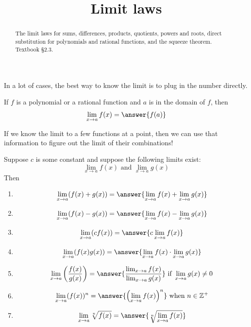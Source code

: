 \documentclass{ximera}
\title{Limit laws}
\begin{document}
\begin{abstract}
The limit laws for sums, differences, products, quotients, powers and roots, direct substitution for polynomials and rational functions, and the squeeze theorem. Textbook §2.3.
\end{abstract}
\maketitle

In a lot of cases, the best way to know the limit is to plug in the number directly.

\begin{theorem}
\label{theorem:3-5}
If $f$ is a polynomial or a rational function and $a$ is in the domain of $f$, then
\[
\lim _{x \rightarrow a} f(x)=\answer{f(a)}
\]
\end{theorem}

If we know the limit to a few functions at a point, then we can use that information to figure out the limit of their combinations!

\begin{theorem}
\label{theorem:3-6}
Suppose $c$ is some constant and suppose the following limits exist:
\[
\lim _{x \rightarrow a} f(x) \text { and } \lim _{x \rightarrow a} g(x)
\]
Then
\begin{enumerate}
  \item \[
  \lim _{x \rightarrow a}(f(x)+g(x))=\answer{\lim _{x \rightarrow a} f(x)+\lim _{x \rightarrow a} g(x)}
  \]
  \item \[
  \lim _{x \rightarrow a}(f(x)-g(x))=\answer{\lim _{x \rightarrow a} f(x)-\lim _{x \rightarrow a} g(x)}
  \]
  \item \[
  \lim _{x \rightarrow a}(c f(x))=\answer{c \lim _{x \rightarrow a} f(x)}
  \]
  \item \[
  \lim _{x \rightarrow a}(f(x) g(x))=\answer{\lim _{x \rightarrow a} f(x) \cdot \lim _{x \rightarrow a} g(x)}
  \]
  \item \[
  \lim _{x \rightarrow a}\left(\frac{f(x)}{g(x)}\right)=\answer{\frac{\lim _{x \rightarrow a} f(x)}{\lim _{x \rightarrow a} g(x)}} \text { if } \lim _{x \rightarrow a} g(x) \neq 0
  \]
  \item \[
  \lim _{x \rightarrow a}(f(x))^{n}=\answer{\left(\lim _{x \rightarrow a} f(x)\right)^{n}} \text { when } n \in \mathbb{Z}^{+}
  \]
  \item \[
  \lim _{x \rightarrow a} \sqrt[n]{f(x)}=\answer{\sqrt[n]{\lim _{x \rightarrow a} f(x)}}
  \]
\end{enumerate}
\end{theorem}
\end{document}

